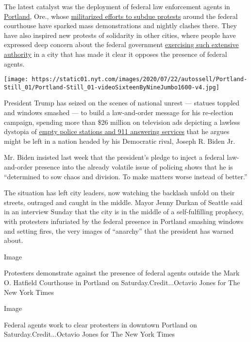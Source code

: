 The latest catalyst was the deployment of federal law enforcement agents
in
\href{https://www.nytimes.com/2020/07/28/us/portland-protests-fact-check.html}{Portland},
Ore., whose
\href{https://www.nytimes.com/2020/07/17/us/portland-protests.html}{militarized
efforts to subdue protests} around the federal courthouse have sparked
mass demonstrations and nightly clashes there. They have also inspired
new protests of solidarity in other cities, where people have expressed
deep concern about the federal government
\href{https://www.nytimes.com/2020/07/25/us/portland-federal-legal-jurisdiction-courts.html}{exercising
such extensive authority} in a city that has made it clear it opposes
the presence of federal agents.

\texttt{[image: https://static01.nyt.com/images/2020/07/22/autossell/Portland-Still\_01/Portland-Still\_01-videoSixteenByNineJumbo1600-v4.jpg]}

President Trump has seized on the scenes of national unrest --- statues
toppled and windows smashed --- to build a law-and-order message for his
re-election campaign, spending more than \$26 million on television ads
depicting a lawless dystopia of
\href{https://www.youtube.com/watch?v=moZOrq0qL3Q}{empty police stations
and 911 answering services} that he argues might be left in a nation
headed by his Democratic rival, Joseph R. Biden Jr.

Mr. Biden insisted last week that the president's pledge to inject a
federal law-and-order presence into the already volatile issue of
policing shows that he is ``determined to sow chaos and division. To
make matters worse instead of better.''

The situation has left city leaders, now watching the backlash unfold on
their streets, outraged and caught in the middle. Mayor Jenny Durkan of
Seattle said in an interview Sunday that the city is in the middle of a
self-fulfilling prophecy, with protesters infuriated by the federal
presence in Portland smashing windows and setting fires, the very images
of ``anarchy'' that the president has warned about.

Image

Protesters demonstrate against the presence of federal agents outside
the Mark O. Hatfield Courthouse in Portland on Saturday.Credit...Octavio
Jones for The New York Times

Image

Federal agents work to clear protesters in downtown Portland on
Saturday.Credit...Octavio Jones for The New York Times

